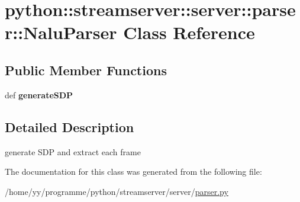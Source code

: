 \hypertarget{classpython_1_1streamserver_1_1server_1_1parser_1_1NaluParser}{
\section{python::streamserver::server::parser::NaluParser Class Reference}
\label{classpython_1_1streamserver_1_1server_1_1parser_1_1NaluParser}
}
\subsection*{Public Member Functions}
\begin{DoxyCompactItemize}
\item 
\hypertarget{classpython_1_1streamserver_1_1server_1_1parser_1_1NaluParser_acfcfa97418b967c40e4841fd27ab607a}{
def {\bfseries generateSDP}}
\label{classpython_1_1streamserver_1_1server_1_1parser_1_1NaluParser_acfcfa97418b967c40e4841fd27ab607a}

\end{DoxyCompactItemize}


\subsection{Detailed Description}
\begin{DoxyVerb}generate SDP and extract each frame\end{DoxyVerb}
 

The documentation for this class was generated from the following file:\begin{DoxyCompactItemize}
\item 
/home/yy/programme/python/streamserver/server/\hyperlink{parser_8py}{parser.py}\end{DoxyCompactItemize}
